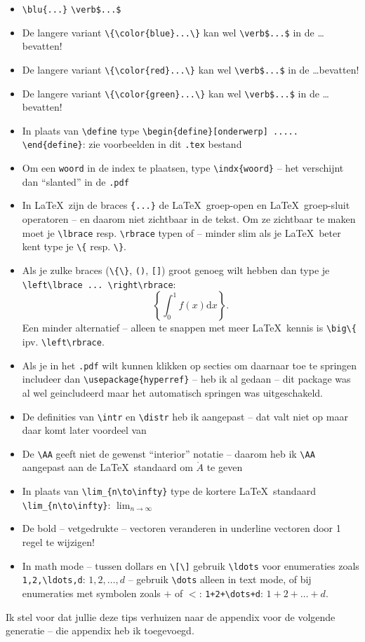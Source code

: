 \documentclass{2wa40summary}
\begin{document}
\begin{itemize}
			\item {} \verb$\blu{...}$  \verb#\verb$...$# 
			\item De langere variant \verb$\{\color{blue}...\}$ kan wel \verb#\verb$...$# in de \dots bevatten!
			\item De langere variant \verb$\{\color{red}...\}$ kan wel \verb#\verb$...$# in de \dots bevatten!
			\item De langere variant \verb$\{\color{green}...\}$ kan wel \verb#\verb$...$# in de \dots bevatten!
			\item In plaats van \verb$\define$ type \verb$\begin{define}[onderwerp] ..... \end{define}$: zie voorbeelden in dit \verb$.tex$ bestand
			\item Om een \verb$woord$ in de index te plaatsen, type \verb$\indx{woord}$ -- het verschijnt dan ``slanted'' in de \verb$.pdf$
			\item In \LaTeX\ zijn de braces \verb${...}$ de \LaTeX\ groep-open en \LaTeX\ groep-sluit operatoren -- en daarom niet zichtbaar in de tekst. Om ze zichtbaar te maken moet je \verb$\lbrace$ resp.{} \verb$\rbrace$ typen of -- minder slim als je \LaTeX\ beter kent type je \verb$\{$ resp.{} \verb$\}$.
			\item Als je zulke braces (\verb$\{\}$, \verb$()$, \verb$[]$) groot genoeg wilt hebben dan type je \verb$\left\lbrace ... \right\rbrace$:
			\[
			\left\lbrace \int_0^1 f(x) \text{d}x \right\rbrace.
			\]
			Een minder alternatief -- alleen te snappen met meer \LaTeX\ kennis is \verb$\big\{$ ipv.{} \verb$\left\rbrace$.
			\item Als je in het \verb$.pdf$ wilt kunnen klikken op secties om daarnaar toe te springen includeer dan
			\verb$\usepackage{hyperref}$ -- heb ik al gedaan -- dit package was al wel geincludeerd maar het automatisch springen was uitgeschakeld.
			\item De definities van \verb$\intr$ en \verb$\distr$ heb ik aangepast -- dat valt niet op maar daar komt later voordeel van
			\item De \verb$\AA$ geeft niet de gewenst ``interior'' notatie -- daarom heb ik \verb$\AA$ aangepast aan de \LaTeX\ standaard
			om $\mathring{A}$ te geven
			\item In plaats van \verb$\lim_{n\to\infty}$ type de kortere \LaTeX\ standaard \verb$\lim_{n\to\infty}$: $\lim_{n\to\infty}$
			\item De bold -- vetgedrukte -- vectoren veranderen in underline vectoren door 1 regel te wijzigen!
			\item In math mode -- tussen dollars en \verb|\[\]| gebruik \verb$\ldots$ voor enumeraties zoals \verb$1,2,\ldots,d$: $1,2,\ldots,d$ -- gebruik \verb$\dots$ alleen in text mode, of bij enumeraties met symbolen zoals $+$ of $<$: \verb$1+2+\dots+d$: $1+2+\dots+d$.
		\end{itemize}
		Ik stel voor dat jullie deze tips verhuizen naar de appendix voor de volgende generatie -- die appendix heb ik toegevoegd.
		
\end{document}
